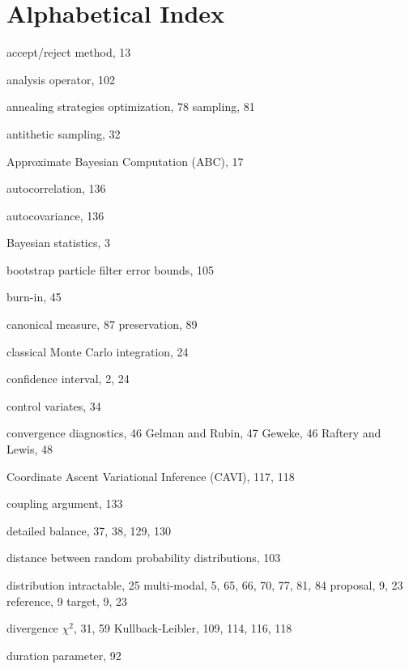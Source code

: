 
\chapter*{Alphabetical Index}

\begin{theindex}

\item accept/reject method, 13
\item analysis operator, 102
\item annealing strategies
  \subitem optimization, 78
  \subitem sampling, 81
\item antithetic sampling, 32
\item Approximate Bayesian Computation (ABC), 17
\item autocorrelation, 136
\item autocovariance, 136

\indexspace

\item Bayesian statistics, 3
\item bootstrap particle filter
  \subitem error bounds, 105
\item burn-in, 45

\indexspace

\item canonical measure, 87
  \subitem preservation, 89
\item classical Monte Carlo integration, 24
\item confidence interval, 2, 24
\item control variates, 34
\item convergence diagnostics, 46
  \subitem Gelman and Rubin, 47
  \subitem Geweke, 46
  \subitem Raftery and Lewis, 48
\item Coordinate Ascent Variational Inference (CAVI), 117, 118
\item coupling argument, 133

\indexspace

\item detailed balance, 37, 38, 129, 130
\item distance between random probability distributions, 103
\item distribution
  \subitem intractable, 25
  \subitem multi-modal, 5, 65, 66, 70, 77, 81, 84
  \subitem proposal, 9, 23
  \subitem reference, 9
  \subitem target, 9, 23
\item divergence
  \subitem $\chi^2$, 31, 59
  \subitem Kullback-Leibler, 109, 114, 116, 118
\item duration parameter, 92


\end{theindex}
